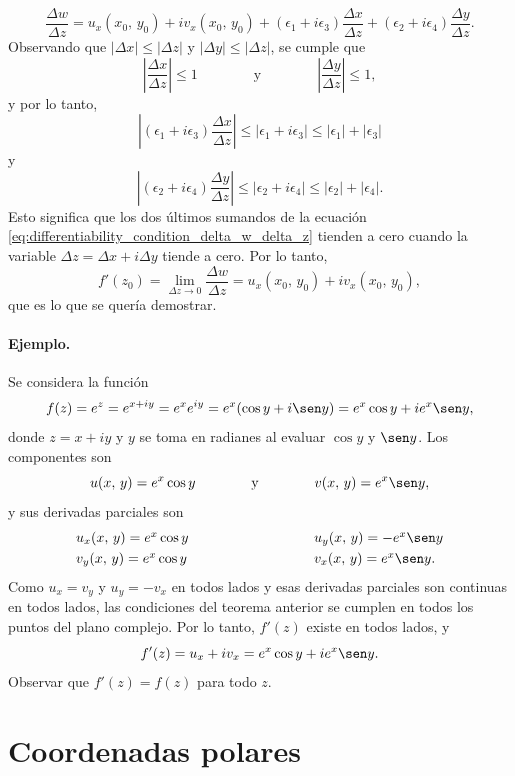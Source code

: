 \documentclass[a4paper]{report}
\begin{document}
\begin{equation}\label{eq:differentiability_condition_delta_w_delta_z}
 \frac{\Delta w}{\Delta z}=u_x(x_0,\,y_0)+iv_x(x_0,\,y_0)+(\epsilon_1+i\epsilon_3)\frac{\Delta x}{\Delta z}+(\epsilon_2+i\epsilon_4)\frac{\Delta y}{\Delta z}.
\end{equation}
Observando que \(|\Delta x|\leq|\Delta z|\) y \(|\Delta y|\leq|\Delta z|\), se cumple que 
\[
 \left|\frac{\Delta x}{\Delta z}\right|\leq1
 \qquad\qquad\textrm{y}\qquad\qquad
 \left|\frac{\Delta y}{\Delta z}\right|\leq1,
\]
y por lo tanto,
\[
 \left|(\epsilon_1+i\epsilon_3)\frac{\Delta x}{\Delta z}\right|\leq|\epsilon_1+i\epsilon_3|\leq|\epsilon_1|+|\epsilon_3|
\]
y
\[
 \left|(\epsilon_2+i\epsilon_4)\frac{\Delta y}{\Delta z}\right|\leq|\epsilon_2+i\epsilon_4|\leq|\epsilon_2|+|\epsilon_4|.
\]
Esto significa que los dos últimos sumandos de la ecuación \ref{eq:differentiability_condition_delta_w_delta_z} tienden a cero cuando la variable \(\Delta z=\Delta x+i\Delta y\) tiende a cero. Por lo tanto,
\[
 f'(z_0)=\lim_{\Delta z\to0}\frac{\Delta w}{\Delta z}=u_x(x_0,\,y_0)+iv_x(x_0,\,y_0),
\]
que es lo que se quería demostrar.

\paragraph{Ejemplo.} Se considera la función
\[
 f(z)=e^z=e^{x+iy}=e^xe^{iy}=e^x(\cos y+i\sen y)=e^x\cos y+ie^x\sen y,
\]
donde \(z=x+iy\) y \(y\) se toma en radianes al evaluar \(\cos y\) y \(\sen y\). Los componentes son 
 \[
  u(x,\,y)=e^x\cos y
  \qquad\qquad\textrm{y}\qquad\qquad
  v(x,\,y)=e^x\sen y,
 \]
y sus derivadas parciales son 
\[
 \begin{array}{ll}
  u_x(x,\,y)=e^x\cos y\qquad\qquad\qquad\qquad&u_y(x,\,y)=-e^x\sen y\\[\smallskipamount]
  v_y(x,\,y)=e^x\cos y\qquad\qquad\qquad\qquad&v_x(x,\,y)=e^x\sen y.
 \end{array}
\] 
Como \(u_x=v_y\) y \(u_y=-v_x\) en todos lados y esas derivadas parciales son continuas en todos lados, las condiciones del teorema anterior se cumplen en todos los puntos del plano complejo. Por lo tanto, \(f'(z)\) existe en todos lados, y
\[
 f'(z)=u_x+iv_x=e^x\cos y+ie^x\sen y.
\]
Observar que \(f'(z)=f(z)\) para todo \(z\).

\section{Coordenadas polares}\label{sec:cauchy_riemann_equations_polar}
\end{document}
